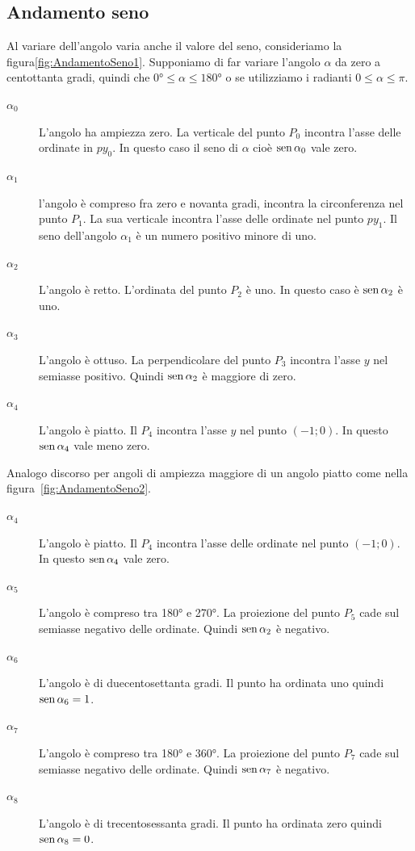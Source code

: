 \subsection{Andamento seno}
\label{subs:AndamentoSeno}
Al variare dell'angolo varia anche il valore del seno, consideriamo la figura\nobs\vref{fig:AndamentoSeno1}. Supponiamo di far variare l'angolo $\alpha$ da zero a centottanta gradi, quindi che $\ang{0}\leq\alpha\leq\ang{180}$ o se utilizziamo i radianti $0\leq\alpha\leq\pi$. 
\begin{description}
	\item[$\alpha_0$] L'angolo ha ampiezza zero. La verticale del punto $P_0$  incontra l'asse delle ordinate in $py_0$. In questo caso il seno di $\alpha$ cioè $\operatorname{sen}\alpha_0$ vale zero.
	\item [$\alpha_1$] l'angolo è compreso fra zero e novanta gradi, incontra la circonferenza nel punto $P_1$. La sua verticale incontra l'asse delle ordinate nel punto $py_1$. Il seno dell'angolo $\alpha_1$ è un numero positivo minore di uno.
	\item [$\alpha_2$] L'angolo  è retto. L'ordinata del punto $P_2$ è uno. In questo caso  è   $\operatorname{sen}\alpha_2$ è uno. 
	\item [$\alpha_3$]  L'angolo è ottuso. La perpendicolare del punto $P_3$ incontra  l'asse $y$ nel semiasse positivo. Quindi $\operatorname{sen}\alpha_2$ è maggiore di zero.
	\item [$\alpha_4$] L'angolo  è  piatto. Il  $P_4$ incontra l'asse $y$ nel punto $(-1;0)$. In questo  $\operatorname{sen}\alpha_4$ vale meno zero.
\end{description}
Analogo discorso per angoli di ampiezza  maggiore di un angolo  piatto come nella figura~\vref{fig:AndamentoSeno2}.
\begin{description}
	\item [$\alpha_4$] L'angolo è piatto. Il  $P_4$ incontra l'asse delle ordinate nel punto $(-1;0)$. In questo  $\operatorname{sen}\alpha_4$ vale zero.
	\item [$\alpha_5$] L'angolo è compreso tra \ang{180} e \ang{270}. La proiezione del punto $P_5$ cade sul semiasse negativo delle ordinate. Quindi $\operatorname{sen}\alpha_2$ è negativo.
	\item [$\alpha_6$] L'angolo è di duecentosettanta gradi. Il punto ha ordinata uno quindi  $\operatorname{sen}\alpha_6=1$.
	\item [$\alpha_7$] L'angolo è compreso tra \ang{180} e \ang{360}. La proiezione del punto $P_7$ cade sul semiasse negativo delle ordinate. Quindi $\operatorname{sen}\alpha_7$ è negativo.
	\item [$\alpha_8$] L'angolo è di trecentosessanta gradi. Il punto ha ordinata zero quindi  $\operatorname{sen}\alpha_8=0$.
\end{description}
